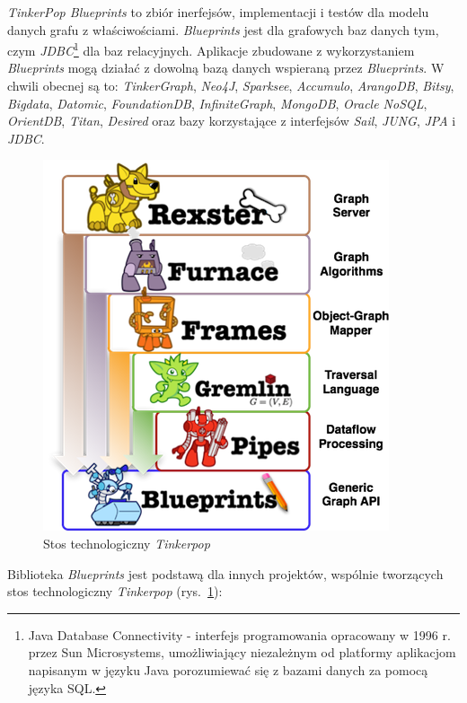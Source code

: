 \emph{TinkerPop Blueprints} to zbiór inerfejsów, implementacji i testów dla modelu danych grafu z właściwościami. \emph{Blueprints} jest dla grafowych baz danych tym, czym \emph{JDBC}\footnote{Java Database Connectivity - interfejs programowania opracowany w 1996 r. przez Sun Microsystems, umożliwiający niezależnym od platformy aplikacjom napisanym w języku Java porozumiewać się z bazami danych za pomocą języka SQL.} dla baz relacyjnych. Aplikacje zbudowane z wykorzystaniem \emph{Blueprints} mogą działać z dowolną bazą danych wspieraną przez \emph{Blueprints}. W chwili obecnej są to: \emph{TinkerGraph}, \emph{Neo4J}, \emph{Sparksee}, \emph{Accumulo}, \emph{ArangoDB}, \emph{Bitsy}, \emph{Bigdata}, \emph{Datomic}, \emph{FoundationDB}, \emph{InfiniteGraph}, \emph{MongoDB}, \emph{Oracle NoSQL}, \emph{OrientDB}, \emph{Titan}, \emph{Desired} oraz bazy korzystające z interfejsów \emph{Sail}, \emph{JUNG}, \emph{JPA} i \emph{JDBC}.


\begin{figure}[htbp]
    \centering
    \includegraphics{rexster-system-arch}
    \caption{Stos technologiczny \emph{Tinkerpop}}
    \label{fig:tinkerpopStack}
\end{figure}

Biblioteka \emph{Blueprints} jest podstawą dla innych projektów, wspólnie tworzących stos technologiczny \emph{Tinkerpop} (rys.~\ref{fig:tinkerpopStack}):

